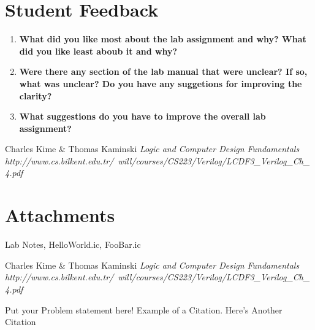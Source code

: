 \documentclass[a4paper,12pt]{article}
\begin{document}
\section*{Student Feedback}

\begin{enumerate}
  \item \textbf{What did you like most about the lab assignment and why? What did you like least aboub it and why?}
  \vspace{10pt}

  \item \textbf{Were there any section of the lab manual that were unclear? If so, what was unclear? Do you have any suggetions for improving the clarity?}
  \vspace{10pt}

  \item \textbf{What suggestions do you have to improve the overall lab assignment?}
  \vspace{10pt}

\end{enumerate}

\ifx
\begin{thebibliography}{1}
 Charles Kime \& Thomas Kaminski  \emph{Logic and Computer Design Fundamentals} \\ \hspace{15pt}\textit{http://www.cs.bilkent.edu.tr/~will/courses/CS223/Verilog/LCDF3_Verilog_Ch_4.pdf}
\end{thebibliography}

\section*{Attachments}
Lab Notes, HelloWorld.ic, FooBar.ic

\begin{thebibliography}{9}
 Charles Kime & Thomas Kaminski  \emph{Logic and Computer Design Fundamentals} \textit{http://www.cs.bilkent.edu.tr/~will/courses/CS223/Verilog/LCDF3_Verilog_Ch_4.pdf}
\end{thebibliography}

Put your Problem statement here! Example of a Citation\cite[p.219]{Robotics}. Here's Another Citation\cite{Flueck}
\fi
\end{document}
